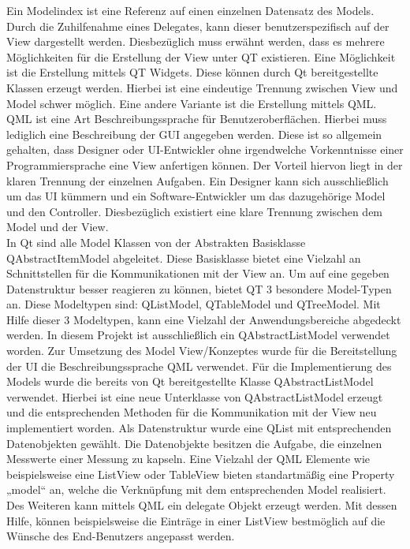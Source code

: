 Ein Modelindex ist eine Referenz auf einen einzelnen Datensatz des Models. Durch die Zuhilfenahme eines Delegates, kann dieser benutzerspezifisch auf der View dargestellt werden. Diesbezüglich muss erwähnt werden, dass es mehrere Möglichkeiten für die Erstellung der View unter QT existieren. Eine Möglichkeit ist die Erstellung mittels QT Widgets. Diese können durch Qt bereitgestellte Klassen erzeugt werden. Hierbei ist eine eindeutige Trennung zwischen View und Model schwer möglich. Eine andere Variante ist die Erstellung mittels QML. QML ist eine Art Beschreibungssprache für Benutzeroberflächen. Hierbei muss lediglich eine Beschreibung der GUI angegeben werden. Diese ist so allgemein gehalten, dass Designer oder UI-Entwickler ohne irgendwelche Vorkenntnisse einer Programmiersprache eine View anfertigen können. Der Vorteil hiervon liegt in der klaren Trennung der einzelnen Aufgaben. Ein Designer kann sich ausschließlich um das UI kümmern und ein Software-Entwickler um das dazugehörige Model und den Controller. Diesbezüglich existiert eine klare Trennung zwischen dem Model und der View.\\

In Qt sind alle Model Klassen von der Abstrakten Basisklasse QAbstractItemModel abgeleitet. Diese Basisklasse bietet eine Vielzahl an Schnittstellen für die Kommunikationen mit der View an. Um auf eine gegeben Datenstruktur besser reagieren zu können, bietet QT 3 besondere Model-Typen an. Diese Modeltypen sind: QListModel, QTableModel und QTreeModel. Mit Hilfe dieser 3 Modeltypen, kann eine Vielzahl der Anwendungsbereiche abgedeckt werden. In diesem Projekt ist ausschließlich ein QAbstractListModel verwendet worden. Zur Umsetzung des Model View/Konzeptes wurde für die Bereitstellung der UI die Beschreibungssprache QML verwendet. Für die Implementierung des Models wurde die bereits von Qt bereitgestellte Klasse QAbstractListModel verwendet. Hierbei ist eine neue Unterklasse von QAbstractListModel erzeugt und die entsprechenden Methoden für die Kommunikation mit der View neu implementiert worden. Als Datenstruktur wurde eine QList mit entsprechenden Datenobjekten gewählt. Die Datenobjekte besitzen die Aufgabe, die einzelnen Messwerte einer Messung zu kapseln. Eine Vielzahl der QML Elemente wie beispielsweise eine ListView oder TableView bieten standartmäßig eine Property „model“ an, welche die Verknüpfung mit dem entsprechenden Model realisiert. Des Weiteren kann mittels QML ein delegate Objekt erzeugt werden. Mit dessen Hilfe, können beispielsweise die Einträge in einer ListView bestmöglich auf die Wünsche des End-Benutzers angepasst werden. \\

